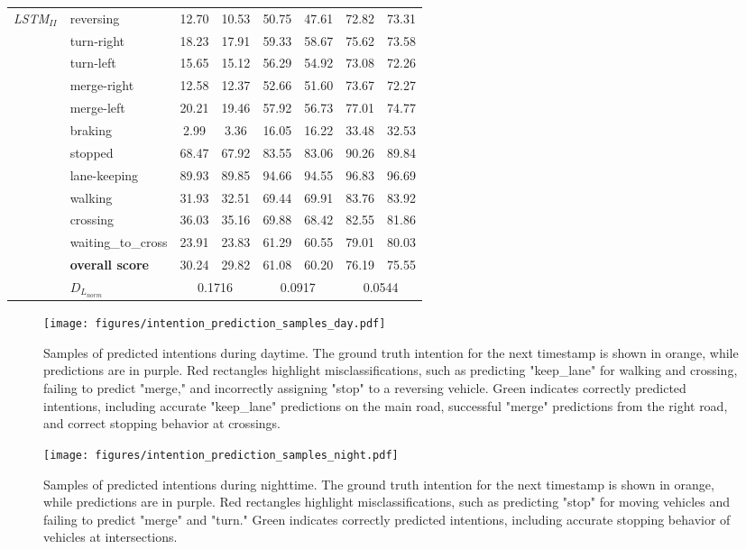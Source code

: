 \begin{table*}[t]
{\begin{tabular}{|p{1.3cm}|p{2cm}|c|c|c|c|c|c|}
\multirow{11}{*}{\textit{LSTM}$_{II}$}  & reversing  & 12.70 & 10.53 & 50.75 & 47.61 & 72.82 & 73.31 \\ 
& turn-right & 18.23 & 17.91 & 59.33 & 58.67 & 75.62 & 73.58  \\ 
& turn-left & 15.65 & 15.12 & 56.29 & 54.92 & 73.08 & 72.26 \\ 
& merge-right & 12.58 & 12.37 & 52.66 & 51.60 & 73.67 & 72.27 \\ 
& merge-left & 20.21 & 19.46 & 57.92 & 56.73 & 77.01& 74.77 \\ 
& braking & 2.99 & 3.36 & 16.05 & 16.22 & 33.48 & 32.53 \\
& stopped & 68.47 & 67.92 & 83.55 & 83.06 & 90.26 & 89.84\\ 
& lane-keeping & 89.93 & 89.85 & 94.66 & 94.55 & 96.83& 96.69\\
& walking & 31.93 & 32.51 & 69.44 & 69.91 & 83.76 & 83.92 \\ 
& crossing & 36.03 & 35.16 & 69.88 & 68.42 & 82.55 & 81.86 \\ 
& waiting\_to\_cross & 23.91 & 23.83 & 61.29 & 60.55 & 79.01 & 80.03\\ \cline{2-8}
& \textbf{overall score} & 30.24 & 29.82 & 61.08 & 60.20 & 76.19 & 75.55 \\ \cline{2-8}
& \textbf{$D_{L_{norm}}$} & \multicolumn{2}{|c|}{0.1716} & \multicolumn{2}{|c|}{0.0917} & \multicolumn{2}{|c|}{0.0544} \\ \hline
\end{tabular}
}
\label{tab:intention_results}
\end{table*}

\begin{figure*}[h!]
\centering
\texttt{[image: figures/intention\_prediction\_samples\_day.pdf]}
\caption{Samples of predicted intentions during daytime. The ground truth intention for the next timestamp is shown in orange, while predictions are in purple. Red rectangles highlight misclassifications, such as predicting "keep\_lane" for walking and crossing, failing to predict "merge," and incorrectly assigning "stop" to a reversing vehicle. Green indicates correctly predicted intentions, including accurate "keep\_lane" predictions on the main road, successful "merge" predictions from the right road, and correct stopping behavior at crossings.}
\label{fig:intention_day}
\end{figure*}

\begin{figure*}[h!]
\centering
\texttt{[image: figures/intention\_prediction\_samples\_night.pdf]}
\caption{Samples of predicted intentions during nighttime. The ground truth intention for the next timestamp is shown in orange, while predictions are in purple. Red rectangles highlight misclassifications, such as predicting "stop" for moving vehicles and failing to predict "merge" and "turn." Green indicates correctly predicted intentions, including accurate stopping behavior of vehicles at intersections.}
\label{fig:intention_night}
\end{figure*}



